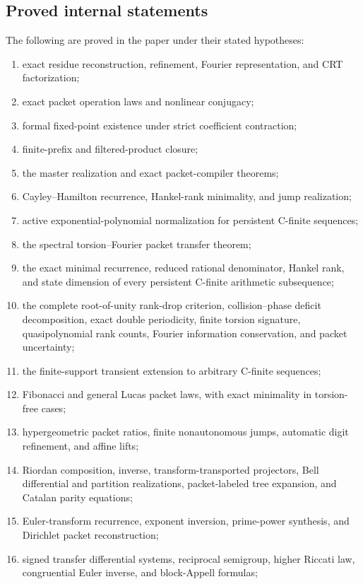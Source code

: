 \documentclass[11pt]{article}
\theoremstyle{definition}\newtheorem{definition}[theorem]{Definition}\newtheorem{example}[theorem]{Example}\newtheorem{construction}[theorem]{Construction}\newtheorem{algorithm}[theorem]{Algorithm}\newtheorem{conjecture}[theorem]{Conjecture}\newtheorem{problem}[theorem]{Problem}
\theoremstyle{remark}\newtheorem{remark}[theorem]{Remark}\newtheorem{boundary}[theorem]{Boundary}\newtheorem{certificate}[theorem]{Computational Certificate}\newtheorem{classical}[theorem]{Classical Input}\newtheorem{principle}[theorem]{Structural Principle}
\begin{document}
\subsection{Proved internal statements}
The following are proved in the paper under their stated hypotheses:
\begin{enumerate}
\item exact residue reconstruction, refinement, Fourier representation, and CRT factorization;
\item exact packet operation laws and nonlinear conjugacy;
\item formal fixed-point existence under strict coefficient contraction;
\item finite-prefix and filtered-product closure;
\item the master realization and exact packet-compiler theorems;
\item Cayley--Hamilton recurrence, Hankel-rank minimality, and jump realization;
\item active exponential-polynomial normalization for persistent C-finite sequences;
\item the spectral torsion--Fourier packet transfer theorem;
\item the exact minimal recurrence, reduced rational denominator, Hankel rank, and state dimension of every persistent C-finite arithmetic subsequence;
\item the complete root-of-unity rank-drop criterion, collision--phase deficit decomposition, exact double periodicity, finite torsion signature, quasipolynomial rank counts, Fourier information conservation, and packet uncertainty;
\item the finite-support transient extension to arbitrary C-finite sequences;
\item Fibonacci and general Lucas packet laws, with exact minimality in torsion-free cases;
\item hypergeometric packet ratios, finite nonautonomous jumps, automatic digit refinement, and affine lifts;
\item Riordan composition, inverse, transform-transported projectors, Bell differential and partition realizations, packet-labeled tree expansion, and Catalan parity equations;
\item Euler-transform recurrence, exponent inversion, prime-power synthesis, and Dirichlet packet reconstruction;
\item signed transfer differential systems, reciprocal semigroup, higher Riccati law, congruential Euler inverse, and block-Appell formulas;

\end{enumerate}
\end{document}

